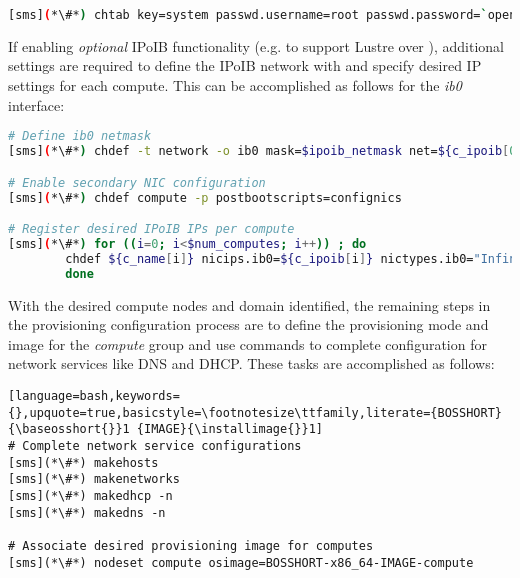 \begin{lstlisting}[language=bash,keywords={},upquote=true,basicstyle=\footnotesize\ttfamily,]
[sms](*\#*) chtab key=system passwd.username=root passwd.password=`openssl rand -base64 12`
\end{lstlisting}
\fi

If enabling {\em optional} IPoIB functionality (e.g. to support Lustre over \InfiniBand{}), additional
settings are required to define the IPoIB network with \xCAT{} and specify
desired IP settings for each compute. This can be accomplished as follows for
the {\em ib0} interface:

\begin{lstlisting}[language=bash,keywords={},upquote=true,basicstyle=\footnotesize\ttfamily]
# Define ib0 netmask
[sms](*\#*) chdef -t network -o ib0 mask=$ipoib_netmask net=${c_ipoib[0]}

# Enable secondary NIC configuration
[sms](*\#*) chdef compute -p postbootscripts=confignics

# Register desired IPoIB IPs per compute
[sms](*\#*) for ((i=0; i<$num_computes; i++)) ; do
		chdef ${c_name[i]} nicips.ib0=${c_ipoib[i]} nictypes.ib0="InfiniBand" nicnetworks.ib0=ib0
        done
\end{lstlisting}

With the desired compute nodes and domain identified, the remaining steps in the
provisioning configuration process are to define the provisioning mode and
image for the {\em compute} group and use \xCAT{} commands to complete
configuration for network services like DNS and DHCP. These tasks are
accomplished as follows:

\begin{lstlisting}[language=bash,keywords={},upquote=true,basicstyle=\footnotesize\ttfamily,literate={BOSSHORT}{\baseosshort{}}1 {IMAGE}{\installimage{}}1]
# Complete network service configurations
[sms](*\#*) makehosts
[sms](*\#*) makenetworks
[sms](*\#*) makedhcp -n
[sms](*\#*) makedns -n

# Associate desired provisioning image for computes
[sms](*\#*) nodeset compute osimage=BOSSHORT-x86_64-IMAGE-compute
\end{lstlisting}

